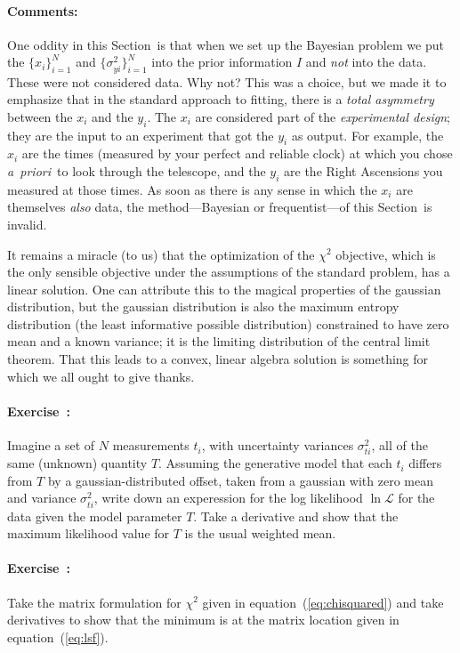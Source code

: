 \documentclass[12pt,twoside]{article}
\newcommand{\notenglish}[1]{\textsl{#1}}
\newcommand{\apriori}{\notenglish{a~priori}}
\newcommand{\sectionname}{Section}
\newcommand{\equationname}{equation}
\newcommand{\problemname}{Exercise}
\newcommand{\commentsname}{Comments}
\newcounter{problem}
\newenvironment{problem}{\paragraph{\problemname~\theproblem:}\refstepcounter{problem}}{}
\newenvironment{comments}{\paragraph{\commentsname:}}{}
\newcommand{\setofall}[3]{\{{#1}\}_{{#2}}^{{#3}}}
\newcommand{\allx}{\setofall{x_i}{i=1}{N}}
\newcommand{\allsigmay}{\setofall{\sigma_{yi}^2}{i=1}{N}}
\newcommand{\like}{\mathscr{L}}
\begin{document}
\begin{comments}
One oddity in this \sectionname\ is that when we set up the Bayesian
problem we put the $\allx$ and $\allsigmay$ into the prior information
$I$ and \emph{not} into the data.  These were not considered data.
Why not?  This was a choice, but we made it to emphasize that in the
standard approach to fitting, there is a \emph{total asymmetry}
between the $x_i$ and the $y_i$.  The $x_i$ are considered part of the
\emph{experimental design}; they are the input to an experiment that
got the $y_i$ as output.  For example, the $x_i$ are the times
(measured by your perfect and reliable clock) at which you chose
\apriori\ to look through the telescope, and the $y_i$ are the Right
Ascensions you measured at those times.  As soon as there is any sense
in which the $x_i$ are themselves \emph{also} data, the
method---Bayesian or frequentist---of this \sectionname\ is invalid.

It remains a miracle (to us) that the optimization of the $\chi^2$
objective, which is the only sensible objective under the assumptions
of the standard problem, has a linear solution.  One can attribute
this to the magical properties of the gaussian distribution, but the
gaussian distribution is also the maximum entropy distribution (the
least informative possible distribution) constrained to have zero mean
and a known variance; it is the limiting distribution of the central
limit theorem.  That this leads to a convex, linear algebra solution
is something for which we all ought to give thanks.
\end{comments}

\begin{problem}
Imagine a set of $N$ measurements $t_i$, with uncertainty variances
$\sigma_{ti}^2$, all of the same (unknown) quantity $T$.  Assuming the
generative model that each $t_i$ differs from $T$ by a
gaussian-distributed offset, taken from a gaussian with zero mean and
variance $\sigma_{ti}^2$, write down an experession for the log
likelihood $\ln\like$ for the data given the model parameter $T$.
Take a derivative and show that the maximum likelihood value for $T$
is the usual weighted mean.
\end{problem}

\begin{problem}
Take the matrix formulation for $\chi^2$ given in
\equationname~(\ref{eq:chisquared}) and take derivatives to show that
the minimum is at the matrix location given in
\equationname~(\ref{eq:lsf}).
\end{problem}
\end{document}
